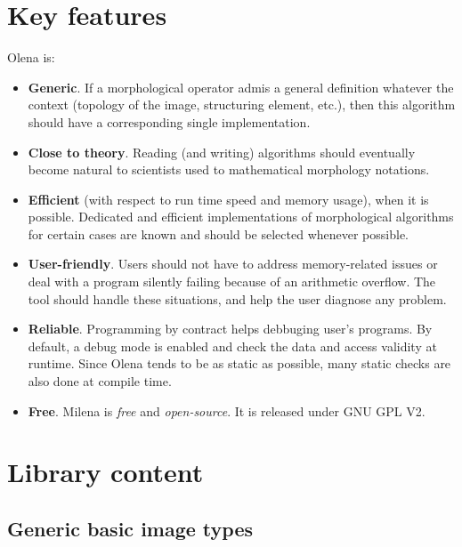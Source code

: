 \documentclass{article}
\begin{document}
\section{Key features}
Olena is:
\begin{itemize}
  \item \textbf{Generic}. If a morphological operator admis a general
	definition whatever the context (topology of the image, structuring
	element, etc.), then this algorithm should have a corresponding single
	implementation.

  \item \textbf{Close to theory}. Reading (and writing) algorithms should
	eventually become natural to scientists used to mathematical morphology
	notations.

  \item \textbf{Efficient} (with respect to run time speed and memory
	usage), when it is possible. Dedicated and efficient implementations of
	morphological algorithms for certain cases are known and should be
	selected whenever possible.

  \item \textbf{User-friendly}. Users should not have to address
	memory-related issues or deal with a program silently failing because of
	an arithmetic overflow. The tool should handle these situations, and
	help the user diagnose any problem.

  \item \textbf{Reliable}. Programming by contract helps debbuging user's
        programs. By default, a debug mode is enabled and check the data and
	access validity at runtime. Since Olena tends to be as static as
	possible, many static checks are also done at compile time.

  \item \textbf{Free}. Milena is \textit{free} and \textit{open-source}. It is
	released under GNU GPL V2.
\end{itemize}


\section{Library content}

\subsection{Generic basic image types}
\end{document}
